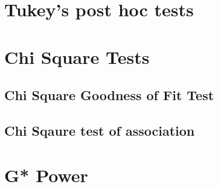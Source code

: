 \documentclass[
]{book}
\begin{document}
\hypertarget{tukeys-post-hoc-tests}{%
\chapter{Tukey's post hoc tests}\label{tukeys-post-hoc-tests}}

\hypertarget{chi-square-tests}{%
\chapter{Chi Square Tests}\label{chi-square-tests}}

\hypertarget{chi-square-goodness-of-fit-test}{%
\section{Chi Square Goodness of Fit Test}\label{chi-square-goodness-of-fit-test}}

\hypertarget{chi-sqaure-test-of-association}{%
\section{Chi Sqaure test of association}\label{chi-sqaure-test-of-association}}

\hypertarget{g-power}{%
\chapter{G* Power}\label{g-power}}

  
\end{document}
